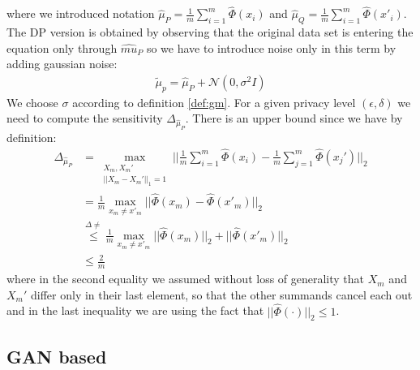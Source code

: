 where we introduced notation $\hat{\mu}_P = \frac{1}{m} \sum_{i=1}^m \hat{\Phi}(x_i)$ and $\hat{\mu}_Q = \frac{1}{m} \sum_{i=1}^m \hat{\Phi}(x'_i)$. The DP version is obtained by observing that the original data set is entering the equation only through $\hat{mu}_P$ so we have to introduce noise only in this term by adding gaussian noise:
\begin{align}
    \tilde{\mu}_p = \hat{\mu}_P + \mathcal{N}(0, \sigma^2 I)
\end{align}
We choose $\sigma$ according to definition \ref{def:gm}. For a given privacy level $(\epsilon, \delta)$ we need to compute the sensitivity $\Delta_{\hat{\mu}_P}$. There is an upper bound since we have by definition:
\begin{align}
    \Delta_{\hat{\mu}_P} &= \max_{\substack{X_m,X_m' \\ ||X_m-X_m'||_1=1}} || \frac{1}{m} \sum_{i=1}^m \hat{\Phi}(x_i) - \frac{1}{m} \sum_{j=1}^m \hat{\Phi}(x_j') ||_2 \nonumber \\
    &= \frac{1}{m} \max_{x_m \neq x'_m} || \hat{\Phi}(x_m) - \hat{\Phi}(x'_m)||_2 \nonumber \\
    &\overset{\Delta \neq}{\leq} \frac{1}{m} \max_{x_m \neq x'_m} || \hat{\Phi}(x_m) ||_2 + ||\hat{\Phi}(x'_m)||_2 \nonumber \\
    &\leq \frac{2}{m} 
\end{align}
where in the second equality we assumed without loss of generality that $X_m$ and $X_m'$ differ only in their last element, so that the other summands cancel each out and in the last inequality we are using the fact that $||\hat{\Phi}(\cdot)||_2 \leq 1$.


\subsection{GAN based} 